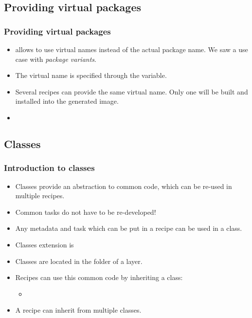 \subsection{Providing virtual packages}

\begin{frame}
  \frametitle{Providing virtual packages}
  \begin{itemize}
    \item {} allows to use virtual names instead of the actual
          package name. We saw a use case with \emph{package
          variants}.
    \item The virtual name is specified through the 
          variable.
    \item Several recipes can provide the same virtual name. Only one
          will be built and installed into the generated image.
    \item {}
  \end{itemize}
\end{frame}

\subsection{Classes}

\begin{frame}
  \frametitle{Introduction to classes}
  \begin{itemize}
    \item Classes provide an abstraction to common code, which can be
          re-used in multiple recipes.
    \item Common tasks do not have to be re-developed!
    \item Any metadata and task which can be put in a recipe can be
          used in a class.
    \item Classes extension is 
    \item Classes are located in the  folder of a layer.
    \item Recipes can use this common code by inheriting a class:
    \begin{itemize}
      \item {}
    \end{itemize}
    \item A recipe can inherit from multiple classes.
  \end{itemize}
\end{frame}

